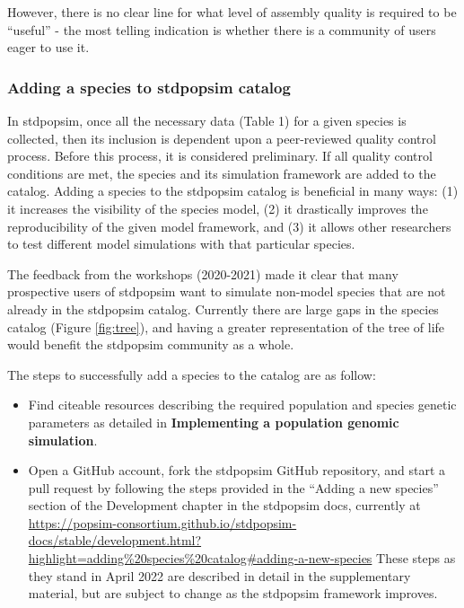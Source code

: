 \documentclass[hidelinks]{article}
\providecommand{\tightlist}{%
\setlength{\itemsep}{0pt}\setlength{\parskip}{0pt}}
\begin{document}
However, there is no clear line for what level of assembly quality is
required to be ``useful'' - the most telling indication is whether there is
a community of users eager to use it.

\hypertarget{adding-a-species-to-stdpopsim-catalog}{%
\subsubsection*{Adding a species to stdpopsim
catalog}\label{adding-a-species-to-stdpopsim-catalog}}

In stdpopsim, once all the necessary data (Table 1) for a given species
is collected, then its inclusion is dependent upon a peer-reviewed
quality control process. Before this process, it is considered preliminary. 
If all quality control conditions are met, the
species and its simulation framework are added to the catalog. Adding a
species to the stdpopsim catalog is beneficial in many ways: (1) it
increases the visibility of the species model, (2) it drastically
improves the reproducibility of the given model framework, and (3) it
allows other researchers to test different model simulations with that
particular species.

The feedback from the workshops (2020-2021) made
it clear that many prospective users of stdpopsim want to simulate
non-model species that are not already in the stdpopsim catalog.
Currently there are large gaps in the species catalog (Figure \ref{fig:tree}), 
and having a greater representation of the tree of life would benefit 
the stdpopsim community as a whole.

The steps to successfully add a species to the catalog are as follow:

\begin{itemize}
\tightlist
\item
  Find citeable resources describing the required population and species
  genetic parameters as detailed in \textbf{Implementing a population genomic simulation}.
\item
  Open a GitHub account, fork the stdpopsim GitHub
  repository, and start a pull request by following the steps provided
  in the ``Adding a new species'' section of the Development chapter in
  the stdpopsim docs, currently at
  \url{https://popsim-consortium.github.io/stdpopsim-docs/stable/development.html?highlight=adding\%20species\%20catalog\#adding-a-new-species}
  These steps as they stand in April 2022 are described in detail in the
  supplementary material, but are subject to change as the stdpopsim
  framework improves.
\end{itemize}
\end{document}

